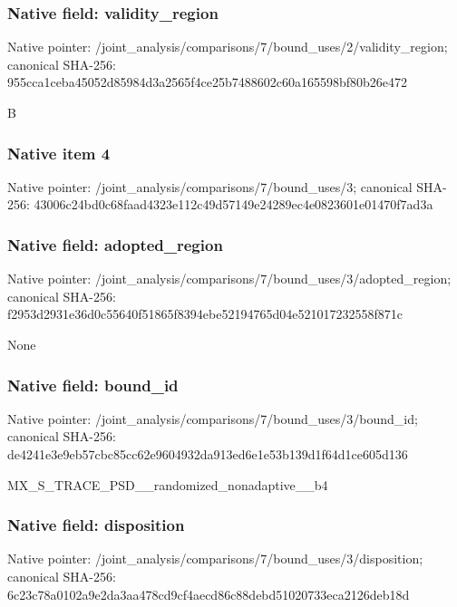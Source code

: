 \documentclass[10pt,a4paper]{article}
\begin{document}
\subsubsection{Native field: validity\_\allowbreak{}region}
Native pointer: /joint\_\allowbreak{}analysis/comparisons/7/bound\_\allowbreak{}uses/2/validity\_\allowbreak{}region; canonical SHA-256: 955cca1ceba45052d85984d3a2565f4ce25b7488602c60a165598bf80b26e472

\begingroup\raggedright\sloppy B\par\endgroup

\subsubsection{Native item 4}
Native pointer: /joint\_\allowbreak{}analysis/comparisons/7/bound\_\allowbreak{}uses/3; canonical SHA-256: 43006c24bd0c68faad4323e112c49d57149e24289ec4e0823601e01470f7ad3a

\subsubsection{Native field: adopted\_\allowbreak{}region}
Native pointer: /joint\_\allowbreak{}analysis/comparisons/7/bound\_\allowbreak{}uses/3/adopted\_\allowbreak{}region; canonical SHA-256: f2953d2931e36d0c55640f51865f8394ebe52194765d04e521017232558f871c

\begingroup\raggedright\sloppy None\par\endgroup

\subsubsection{Native field: bound\_\allowbreak{}id}
Native pointer: /joint\_\allowbreak{}analysis/comparisons/7/bound\_\allowbreak{}uses/3/bound\_\allowbreak{}id; canonical SHA-256: de4241e3e9eb57cbc85cc62e9604932da913ed6e1e53b139d1f64d1ce605d136

\begingroup\raggedright\sloppy MX\_\allowbreak{}S\_\allowbreak{}TRACE\_\allowbreak{}PSD\_\allowbreak{}\_\allowbreak{}randomized\_\allowbreak{}nonadaptive\_\allowbreak{}\_\allowbreak{}b4\par\endgroup

\subsubsection{Native field: disposition}
Native pointer: /joint\_\allowbreak{}analysis/comparisons/7/bound\_\allowbreak{}uses/3/disposition; canonical SHA-256: 6c23c78a0102a9e2da3aa478cd9cf4aecd86c88debd51020733eca2126deb18d
\end{document}
